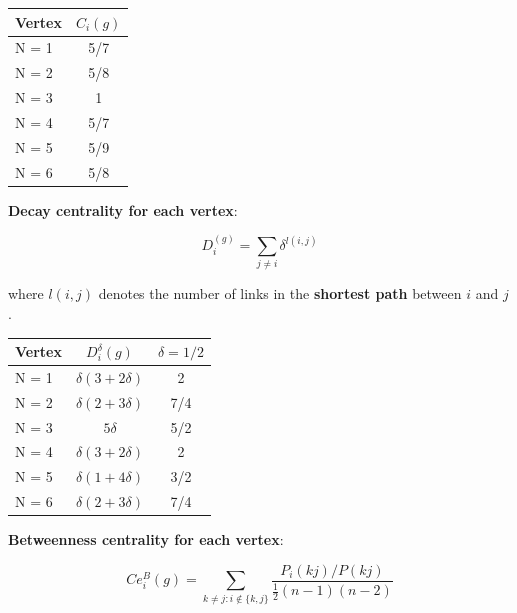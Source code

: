 \documentclass[a4paper]{article}
\begin{document}
\begin{table}[ht!]
	\centering
	 \label{tab:title} 
	\begin{tabular}{l@{\hskip 0.5in}c}
		Vertex & $C_i (g)$\\
		\hline\hline
		
		N = 1    &   5/7 \\
		N = 2   &  5/8 \\
		N = 3   &  1    \\
		N = 4   &  5/7 \\
		N = 5   &  5/9 \\
		N = 6   &  5/8 \\
		
		\bottomrule[1pt]
	\end{tabular}
\end{table}


\noindent \textbf{{\color{blue} Decay centrality for each vertex}}:

\begin{equation}
	D_i^(g) = \sum_{j\ne i}\delta^{l(i,j)}
\end{equation}

where $l(i,j)$ denotes the number of links in the \textbf{shortest path} between $i$ and $j$. 

\begin{table}[ht!]
	\centering
	 \label{tab:title} 
	\begin{tabular}{l@{\hskip 0.5in}c@{\hskip 0.5in}c}
		Vertex & $D^\delta_i (g)$  & $\delta = 1/2$ \\
		\hline\hline
		
		N = 1    &  $\delta(3+2\delta)$ & 2 \\
		N = 2   &  $\delta(2+3\delta)$ & 7/4 \\
		N = 3   &  $5\delta$ &  5/2 \\
		N = 4   &  $\delta(3+2\delta)$ & 2\\
		N = 5   &  $\delta(1+4\delta)$ & 3/2 \\
		N = 6   &  $\delta(2+3\delta)$ & 7/4\\
		
		\bottomrule[1pt]
	\end{tabular}
\end{table}

\vspace{6cm}
\noindent \textbf{{\color{blue} Betweenness centrality for each vertex}}:

\begin{equation}
	Ce_i^B(g) = \sum_{k\ne j: i \not\in \{ k, j \}} \frac{P_i(kj)/P(kj)}{\frac{1}{2}(n-1)(n-2)}
\end{equation}
\end{document}
